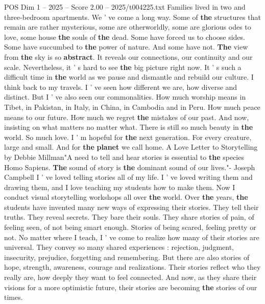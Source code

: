 \begin{textsample}{POS Dim 1 – 2025 – Score 2.00 – 2025/t004225.txt}
Families lived in two and three-bedroom apartments.
We ' ve come a long way.
Some of \textbf{the} structures that remain are rather mysterious, some are otherworldly, some are glorious odes to love, some house \textbf{the} souls of \textbf{the} dead.
Some have forced us to choose sides.
Some have succumbed to \textbf{the} power of nature.
And some have not. \textbf{The} view from \textbf{the} sky is so \textbf{abstract}.
It reveals our connections, our continuity and our scale.
Nevertheless, it ' s hard to see \textbf{the} big picture right now.
It ' s such a difficult time in \textbf{the} world as we pause and dismantle and rebuild our culture.
I think back to my travels.
I ' ve seen how different we are, how diverse and distinct.
But I ' ve also seen our commonalities.
How much worship means in Tibet, in Pakistan, in Italy, in China, in Cambodia and in Peru.
How much peace means to our future.
How much we regret \textbf{the} mistakes of our past.
And now, insisting on what matters no matter what.
There is still so much beauty in \textbf{the} world.
So much love.
I ' m hopeful for \textbf{the} next generation.
For every creature, large and small.
And for \textbf{the} \textbf{planet} we call home.
A Love Letter to Storytelling by Debbie Millman"A need to tell and hear stories is essential to \textbf{the} species Homo Sapiens. \textbf{The} sound of story is \textbf{the} dominant sound of our lives."- Joseph Campbell I ' ve loved telling stories all of my life.
I ' ve loved writing them and drawing them, and I love teaching my students how to make them.
Now I conduct visual storytelling workshops all over \textbf{the} world.
Over \textbf{the} years, \textbf{the} students have invented many new ways of expressing their stories.
They tell their truths.
They reveal secrets.
They bare their souls.
They share stories of pain, of feeling seen, of not being smart enough.
Stories of being scared, feeling pretty or not.
No matter where I teach, I ' ve come to realize how many of their stories are universal.
They convey so many shared experiences : rejection, judgment, insecurity, prejudice, forgetting and remembering.
But there are also stories of hope, strength, awareness, courage and realizations.
Their stories reflect who they really are, how deeply they want to feel connected.
And now, as they share their visions for a more optimistic future, their stories are becoming \textbf{the} stories of our times.

\end{textsample}
